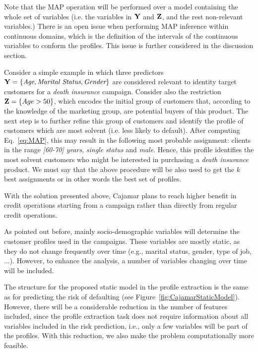 Note that the MAP operation will be performed over a model containing the whole set of variables (i.e. the variables in $\mathbf{Y}$ and $\mathbf{Z}$, and the rest non-relevant variables.) There is an open issue when performing MAP inference within continuous domains, which is the definition of the intervals of the continuous variables to conform the profiles. This issue is further considered in the discussion section. 

Consider a simple example in which three predictors $\mathbf{Y} = \{ \emph{Age}, \emph{Marital Status}, \emph{Gender}\}$ are considered relevant to identity target customers for a \textit{death insurance} campaign. Consider also the restriction $\mathbf{Z} = \{Age>50\}$, which encodes the initial group of customers that, according to the knowledge of the marketing group, are potential buyers of this product.  The next step is to further refine this group of customers and identify the profile of customers which are most solvent (i.e. less likely to default). After computing Eq.~\ref{eq:MAP}, this may result in the following most probable assignment: clients in the range \emph {[60-70] years}, \emph{single status} and \emph{male}. Hence, this profile identifies the most solvent customers who might be interested in purchasing a \emph{death insurance} product. We must say that the above  procedure will be also used to get the $k$ best assignments or in other words the best set of profiles.   

With the solution presented above, Cajamar plans to reach higher benefit in credit operations starting from a campaign rather than directly from regular credit operations.  


As pointed out before, mainly socio-demographic variables will determine the customer profiles used in the campaigns. These variables are mostly static, as they do not change frequently over time (e.g., marital status, gender, type of job, ...). However, to enhance the analysis, a number of  variables changing over time will be included. 

The structure for the proposed static model in the profile extraction is the same as for predicting the risk of defaulting (see Figure~\ref{fig:CajamarStaticModel}). However, there will be a considerable reduction in the number of features included, since the profile extraction task does not require information about all variables included in the risk prediction, i.e., only a few variables will be part of the profiles. With this reduction, we also make the problem computationally more feasible. 

